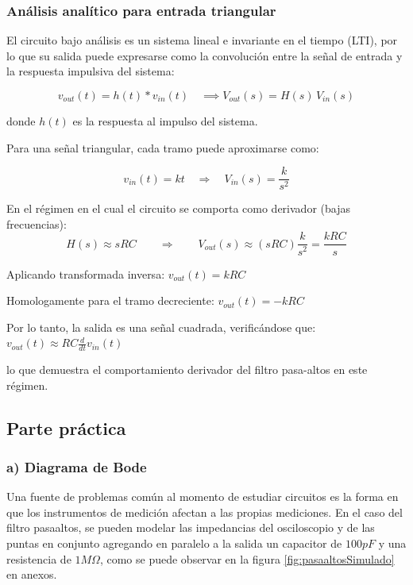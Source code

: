 \documentclass{article}
\begin{document}

    \subsubsection{Análisis analítico para entrada triangular}
	\label{subsec:deduccion analitica derivador}

        El circuito bajo análisis es un sistema lineal e invariante en el tiempo (LTI), por lo que su salida puede expresarse como la convolución entre la señal de entrada y la respuesta impulsiva del sistema:

        \begin{equation*}
            v_{out}(t) = h(t) * v_{in}(t) \quad \implies V_{out}(s) = H(s)\,V_{in}(s)
        \end{equation*}

        donde $h(t)$ es la respuesta al impulso del sistema.
        
        Para una señal triangular, cada tramo puede aproximarse como:

\[
v_{in}(t) = k t \quad \Rightarrow \quad V_{in}(s) = \frac{k}{s^2}
\]

En el régimen en el cual el circuito se comporta como derivador (bajas frecuencias):
\[
H(s) \approx sRC \qquad \Rightarrow \qquad V_{out}(s) \approx (sRC)\frac{k}{s^2} = \frac{kRC}{s}
\]

Aplicando transformada inversa: $ v_{out}(t) = kRC $

Homologamente para el tramo decreciente: $ v_{out}(t) = -kRC$

Por lo tanto, la salida es una señal cuadrada, verificándose que: 
$v_{out}(t) \approx RC \frac{d}{dt} v_{in}(t) $

lo que demuestra el comportamiento derivador del filtro pasa-altos en este régimen.

%
        
    \subsection{Parte práctica}
        \subsubsection*{a) Diagrama de Bode}
            Una fuente de problemas común al momento de estudiar circuitos es la forma en que los instrumentos de medición afectan a las propias mediciones. En el caso del filtro pasaaltos, se pueden modelar las impedancias del osciloscopio y de las puntas en conjunto agregando en paralelo a la salida un capacitor de $ 100 pF $  y una resistencia de $1 M\Omega$, como se puede observar en la figura \ref{fig:pasaaltosSimulado} en anexos.
\end{document}
